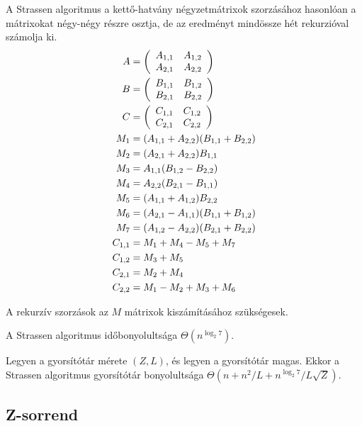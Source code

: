 \documentclass[12pt]{report}
\begin{document}
A Strassen algoritmus\cite{strassen} a kettő-hatvány négyzetmátrixok szorzásához
hasonlóan a mátrixokat négy-négy részre osztja,
de az eredményt mindössze hét rekurzióval számolja ki.
\begin{align*}
A&=\left(
\begin{array}{c c}  
A_{1,1} & A_{1,2} \\
A_{2,1} & A_{2,2}
\end{array}
\right) \\
B&=\left(
\begin{array}{c c}  
B_{1,1} & B_{1,2} \\
B_{2,1} & B_{2,2}
\end{array}
\right) \\
C&=\left(
\begin{array}{c c}  
C_{1,1} & C_{1,2} \\
C_{2,1} & C_{2,2}
\end{array}
\right) \\
M_1 &=(A_{1,1}+A_{2,2})(B_{1,1}+B_{2,2}) \\
M_2 &=(A_{2,1}+A_{2,2})B_{1,1} \\
M_3 &=A_{1,1}(B_{1,2}-B_{2,2}) \\
M_4 &=A_{2,2}(B_{2,1}-B_{1,1}) \\
M_5 &=(A_{1,1}+A_{1,2})B_{2,2} \\
M_6 &=(A_{2,1}-A_{1,1})(B_{1,1}+B_{1,2}) \\
M_7 &=(A_{1,2}-A_{2,2})(B_{2,1}+B_{2,2}) \\
C_{1,1} &= M_1+M_4-M_5+M_7 \\
C_{1,2} &= M_3+M_5 \\
C_{2,1} &= M_2+M_4 \\
C_{2,2} &= M_1-M_2+M_3+M_6
\end{align*}

A rekurzív szorzások az $M$ mátrixok kiszámításához szükségesek.

A Strassen algoritmus időbonyolultsága\cite{strassen} $\Theta(n^{\log_2{7}})$.

Legyen a gyorsítótár mérete $(Z, L)$, és legyen a gyorsítótár magas.
Ekkor a Strassen algoritmus gyorsítótár bonyolultsága\cite{prokop}
$\Theta(n+n^2/L+n^{\log_2{7}}/L\sqrt{Z})$.

\subsection{Z-sorrend}
\end{document}
